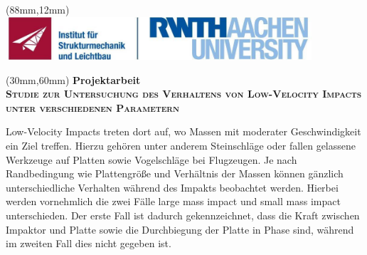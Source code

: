 \begin{textblock*}{110mm}(88mm,12mm)
\includegraphics*[height=16mm]{./pictures/rwth_sla}
\end{textblock*}
%
\begin{textblock*}{\textwidth}(30mm,60mm)
\centering
{\bfseries Projektarbeit} \\[1ex]
\bfseries\scshape Studie zur Untersuchung des Verhaltens von Low-Velocity Impacts unter verschiedenen Parametern\par
\end{textblock*}
\vspace*{40mm}
Low-Velocity Impacts treten dort auf, wo Massen mit moderater Geschwindigkeit ein Ziel treffen. Hierzu gehören unter anderem Steinschläge oder fallen gelassene Werkzeuge auf Platten sowie Vogelschläge bei Flugzeugen. Je nach Randbedingung wie Plattengröße und Verhältnis der Massen können gänzlich unterschiedliche Verhalten während des Impakts beobachtet werden. Hierbei werden vornehmlich die zwei Fälle large mass impact und small mass impact unterschieden. Der erste Fall ist dadurch gekennzeichnet, dass die Kraft zwischen Impaktor und Platte sowie die Durchbiegung der Platte in Phase sind, während im zweiten Fall dies nicht gegeben ist. \\
